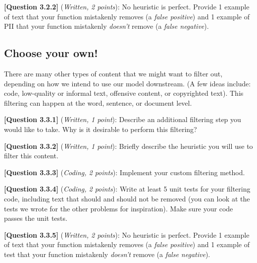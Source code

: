 \documentclass[leqno,12pt]{article}
\begin{document}
\noindent \textbf{[Question 3.2.2]} (\emph{Written, 2 points}): No heuristic is perfect. Provide 1 example of text that your function mistakenly removes (a \textit{false positive}) and 1 example of PII that your function mistakenly \textit{doesn't} remove (a \textit{false negative}). 
\begin{tcolorbox}[fit,height=5cm, width=\linewidth, blank, borderline={1pt}{-2pt}]
\end{tcolorbox}

\subsection{Choose your own!}
\noindent There are many other types of content that we might want to filter out, depending on how we intend to use our model downstream. (A few ideas include: code, low-quality or informal text, offensive content, or copyrighted text). This filtering can happen at the word, sentence, or document level. 

\noindent \textbf{[Question 3.3.1]} (\emph{Written, 1 point}): Describe an additional filtering step you would like to take. Why is it desirable to perform this filtering? 
\begin{tcolorbox}[fit,height=5cm, width=\linewidth, blank, borderline={1pt}{-2pt}]
\end{tcolorbox}

\noindent \textbf{[Question 3.3.2]} (\emph{Written, 1 point}):  Briefly describe the heuristic you will use to filter this content.
\begin{tcolorbox}[fit,height=5cm, width=\linewidth, blank, borderline={1pt}{-2pt}]
\end{tcolorbox}

\noindent \textbf{[Question 3.3.3]} (\emph{Coding, 2 points}): Implement your custom filtering method.

\noindent \textbf{[Question 3.3.4]} (\emph{Coding, 2 points}): Write at least 5 unit tests for your filtering code, including text that should and should not be removed (you can look at the tests we wrote for the other problems for inspiration). Make sure your code passes the unit tests.

\noindent \textbf{[Question 3.3.5]} (\emph{Written, 2 points}): No heuristic is perfect. Provide 1 example of text that your function mistakenly removes (a \textit{false positive}) and 1 example of test that your function mistakenly \textit{doesn't} remove (a \textit{false negative}). 
\begin{tcolorbox}[fit,height=5cm, width=\linewidth, blank, borderline={1pt}{-2pt}]
\end{tcolorbox}
\end{document}
